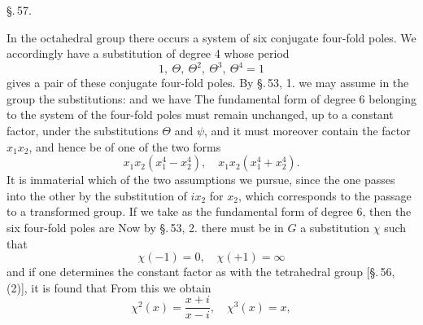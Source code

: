 
\begin{center}
\S.\,57.

\end{center}

In the octahedral group there occurs a system of six conjugate
four-fold poles. We accordingly have a substitution of degree 4
whose period
\[
1, \ \Theta, \ \Theta^2, \ \Theta^3, \ \Theta^4 = 1
\]
gives a pair of these conjugate four-fold poles. By \S.\,53, 1.
we may assume in the group the substitutions:
and we have
The fundamental form of degree 6 belonging to the system of the
four-fold poles must remain unchanged, up to a constant factor,
under the substitutions $\Theta$ and $\psi$, and it must moreover
contain the factor $x_1x_2$, and hence be of one of the two forms
\[
x_1x_2(x_1^4 - x_2^4), \quad x_1x_2(x_1^4 + x_2^4).
\]
It is immaterial which of the two assumptions we pursue, since
the one passes into the other by the substitution of $ix_2$ for $x_2$,
which corresponds to the passage to a transformed group. If we take
as the fundamental form of degree 6, then the six four-fold poles are
Now by \S.\,53, 2. there must be in $G$ a substitution $\chi$
such that
\[
\chi(-1) = 0, \quad \chi(+1) = \infty
\]
and if one determines the constant factor as with the tetrahedral
group [\S.\,56, (2)], it is found that
From this we obtain
\[
\chi^2(x) = \frac{x+i}{x-i}, \quad \chi^3(x) = x,
\]
